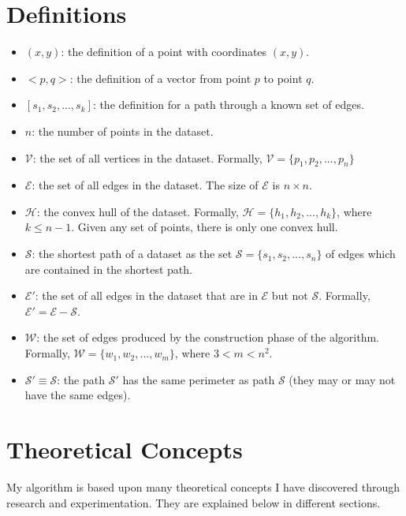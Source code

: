 \documentclass[12pt]{article}
\begin{document}
\section{Definitions}\label{sec:def}
\begin{itemize}
\item $(x,y)$: the definition of a point with coordinates $(x,y)$.
\item $<p,q>$: the definition of a vector from point $p$ to point $q$.
\item $[s_1, s_2, ..., s_k]$: the definition for a path through a known set of edges.
\item $n$: the number of points in the dataset.
\item $\mathcal{V}$: the set of all vertices in the dataset.
Formally, $\mathcal{V} = \{p_1, p_2, ..., p_n\}$
\item $\mathcal{E}$: the set of all edges in the dataset.
The size of $\mathcal{E}$ is $n \times n$.
\item $\mathcal{H}$: the convex hull of the dataset.
Formally, $\mathcal{H} = \{h_1, h_2, ..., h_k\}$, where $k \leq n - 1$.
Given any set of points,
there is only one convex hull.
\item $\mathcal{S}$: the shortest path of a dataset as the set
$\mathcal{S} = \{s_1, s_2, ..., s_n\}$
of edges which are contained in the shortest path.
\item $\mathcal{E}'$: the set of all edges in the dataset that are in $\mathcal{E}$
but not $\mathcal{S}$.
Formally, $\mathcal{E}' = \mathcal{E} - \mathcal{S}$.
\item $\mathcal{W}$: the set of edges produced by the construction phase of the algorithm.
Formally, $\mathcal{W} = \{w_1, w_2, ..., w_m\}$, where $3 < m < n^2$.
\item $\mathcal{S}' \equiv \mathcal{S}$: the path $\mathcal{S}'$ has the same
perimeter as path $\mathcal{S}$
(they may or may not have the same edges).
\end{itemize}

\section{Theoretical Concepts}\label{sec:theory}
My algorithm is based upon many theoretical concepts I have discovered through
research and experimentation. They are explained below in different sections.
\end{document}
